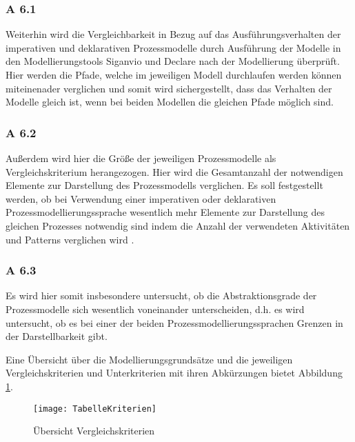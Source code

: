 \subsubsection{A 6.1}
Weiterhin wird die Vergleichbarkeit in Bezug auf das Ausführungsverhalten der imperativen und deklarativen Prozessmodelle durch Ausführung der Modelle in den Modellierungstools Siganvio und Declare nach der Modellierung überprüft. Hier werden die Pfade, welche im jeweiligen Modell durchlaufen werden können miteinenader verglichen und somit wird sichergestellt, dass das Verhalten der Modelle gleich ist, wenn bei beiden Modellen die gleichen Pfade möglich sind.

\subsubsection{A 6.2}
Außerdem wird hier die Größe der jeweiligen Prozessmodelle als Vergleichskriterium herangezogen. Hier wird die Gesamtanzahl der notwendigen Elemente zur Darstellung des Prozessmodells verglichen. Es soll festgestellt werden, ob bei Verwendung einer imperativen oder deklarativen Prozessmodellierungssprache wesentlich mehr Elemente zur Darstellung des gleichen Prozesses notwendig sind indem die Anzahl der verwendeten Aktivitäten und Patterns verglichen wird \cite{leimeister2012, journals95, freund2007,reinshagen2009}.

 \subsubsection{A 6.3}
Es wird hier somit insbesondere untersucht, ob die Abstraktionsgrade der Prozessmodelle sich wesentlich voneinander unterscheiden, d.h. es wird untersucht, ob es bei einer der beiden Prozessmodellierungssprachen Grenzen in der Darstellbarkeit gibt.


Eine Übersicht über die Modellierungsgrundsätze und die jeweiligen Vergleichskriterien und Unterkriterien mit ihren Abkürzungen bietet Abbildung \ref{fig:TabelleKriterien}.

\begin{figure}[!htbp]
\begin{center}
  \texttt{[image: TabelleKriterien]} %
  \caption{Übersicht Vergleichskriterien}
  \label{fig:TabelleKriterien}
\end{center}
\end{figure}









